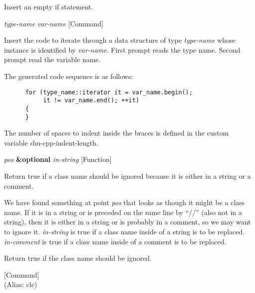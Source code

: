 \begin{doc-string}
Insert an empty if statement.
\end{doc-string}

\vspace{1em}
\noindent
{}
\usebox{\funcname}\emph{type-name} \emph{var-name}
 \hfill [Command]

\begin{doc-string}
Insert the code to iterate through a data structure of type \emph{type-name} whose
instance is identified by \emph{var-name}.  First prompt reads the type name.  Second
prompt read the variable name.

The generated code sequence is as follows:

\small{\begin{verbatim}
      for (type_name::iterator it = var_name.begin();
           it != var_name.end(); ++it)
      {
      }
\end{verbatim}}

The number of spaces to indent inside the braces is defined in the custom
variable shu-cpp-indent-length.
\end{doc-string}

\vspace{1em}
\noindent
{}
\usebox{\funcname}\emph{pos} \textbf{\&optional} \emph{in-string}
 \hfill [Function]
\hspace*{\wd\funcname}

\begin{doc-string}
Return true if a class name should be ignored because it is either in a
string or a comment.

We have found something at point \emph{pos} that looks as though it might be a class
name.  If it is in a string or is preceded on the same line by ``//'' (also not
in a string), then it is either in a string or is probably in a comment, so we
may want to ignore it.  \emph{in-string} is true if a class name inside of a string is
to be replaced.  \emph{in-comment} is true if a class name inside of a comment is to be
replaced.

Return true if the class name should be ignored.
\end{doc-string}

\vspace{1em}
\noindent
{}
\usebox{\funcname}
 \hfill [Command]\\%
 (Alias: clc)

